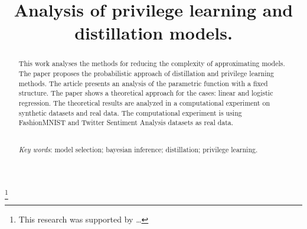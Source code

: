\documentclass[12pt]{a&t}
\begin{document}

\title{Analysis of privilege learning and distillation models.}%
\thanks{This research was supported by \dots}


\maketitle

\begin{abstract}
This work analyses the methods for reducing the complexity of approximating models. The paper proposes the probabilistic approach of distillation and privilege learning methods. The article presents an analysis of the parametric function with a fixed structure. The paper shows a theoretical approach for the cases: linear and logistic regression. The theoretical results are analyzed in a computational experiment on synthetic datasets and real data. The computational experiment is using FashionMNIST and Twitter Sentiment Analysis datasets as real data.

\smallskip\\
\textit{Key words}: model selection; bayesian inference; distillation; privilege learning.
\end{abstract}


\end{document}
